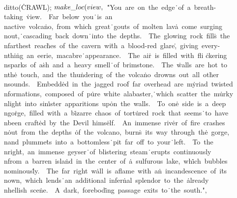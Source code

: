 \\{ditto}(\.{CRAWL});\7
${}\\{make\_loc}(\\{view},{}$\6
\.{"You\ are\ on\ the\ edge}\)\.{\ of\ a\ breath-taking\ }\)\.{view.\ \ Far\ below\ you}\)\.{\ is\ an\\nactive\ volca}\)\.{no,\ from\ which\ great}\)\.{\ gouts\ of\ molten\ lav}\)\.{a\ come\ surging\\nout,}\)\.{\ cascading\ back\ down}\)\.{\ into\ the\
depths.\ \ T}\)\.{he\ glowing\ rock\ fill}\)\.{s\ the\\nfarthest\ reac}\)\.{hes\ of\ the\ cavern\ wi}\)\.{th\ a\ blood-red\ glare}\)\.{,\ giving\ every-\\nthi}\)\.{ng\ an\ eerie,\ macabre}\)\.{\ appearance.\ \ The\ ai}\)\.{r\ is\ filled\ with\ fli}\)%
\.{ckering\\nsparks\ of\ a}\)\.{sh\ and\ a\ heavy\ smell}\)\.{\ of\ brimstone.\ \ The\ }\)\.{walls\ are\ hot\ to\\nth}\)\.{e\ touch,\ and\ the\ thu}\)\.{ndering\ of\ the\ volca}\)\.{no\ drowns\ out\ all\ ot}\)\.{her\\nsounds.\ \ Embedd}\)\.{ed\ in\ the\
jagged\ roo}\)\.{f\ far\ overhead\ are\ m}\)\.{yriad\ twisted\\nforma}\)\.{tions,\ composed\ of\ p}\)\.{ure\ white\ alabaster,}\)\.{\ which\ scatter\ the\ m}\)\.{urky\\nlight\ into\ sin}\)\.{ister\ apparitions\ up}\)\.{on\ the\ walls.\ \ To\ on}\)\.{e\
side\ is\ a\ deep\\ngo}\)\.{rge,\ filled\ with\ a\ b}\)\.{izarre\ chaos\ of\ tort}\)\.{ured\ rock\ that\ seems}\)\.{\ to\ have\\nbeen\ craft}\)\.{ed\ by\ the\ Devil\ hims}\)\.{elf.\ \ An\ immense\ riv}\)\.{er\ of\ fire\ crashes\\n}\)\.{out\ from\ the\
depths\ }\)\.{of\ the\ volcano,\ burn}\)\.{s\ its\ way\ through\ th}\)\.{e\ gorge,\\nand\ plumme}\)\.{ts\ into\ a\ bottomless}\)\.{\ pit\ far\ off\ to\ your}\)\.{\ left.\ \ To\ the\\nrigh}\)\.{t,\ an\ immense\ geyser}\)\.{\ of\ blistering\ steam}\)\.{\
erupts\ continuously}\)\.{\\nfrom\ a\ barren\ isla}\)\.{nd\ in\ the\ center\ of\ }\)\.{a\ sulfurous\ lake,\ wh}\)\.{ich\ bubbles\\nominous}\)\.{ly.\ \ The\ far\ right\ w}\)\.{all\ is\ aflame\ with\ a}\)\.{n\ incandescence\ of\ i}\)\.{ts\\nown,\ which\
lends}\)\.{\ an\ additional\ infer}\)\.{nal\ splendor\ to\ the\ }\)\.{already\\nhellish\ sce}\)\.{ne.\ \ A\ dark,\ forebod}\)\.{ing\ passage\ exits\ to}\)\.{\ the\ south."}${},{}$\6
